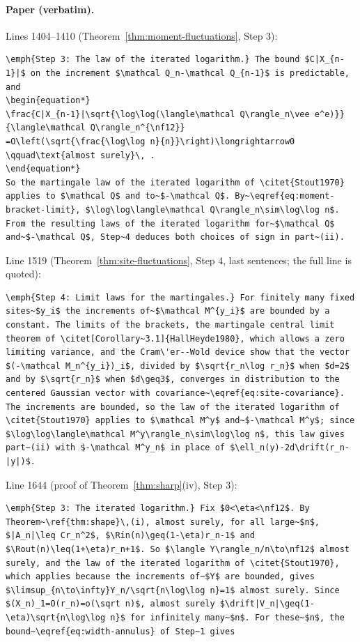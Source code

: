 \paragraph{Paper (verbatim).} Lines 1404--1410 (Theorem~\ref{thm:moment-fluctuations}, Step 3):
\begin{verbatim}
\emph{Step 3: The law of the iterated logarithm.} The bound $C|X_{n-1}|$ on the increment $\mathcal Q_n-\mathcal Q_{n-1}$ is predictable, and
\begin{equation*}
\frac{C|X_{n-1}|\sqrt{\log\log(\langle\mathcal Q\rangle_n\vee e^e)}}{\langle\mathcal Q\rangle_n^{\nf12}}
=O\left(\sqrt{\frac{\log\log n}{n}}\right)\longrightarrow0
\qquad\text{almost surely}\, .
\end{equation*}
So the martingale law of the iterated logarithm of \citet{Stout1970} applies to $\mathcal Q$ and to~$-\mathcal Q$. By~\eqref{eq:moment-bracket-limit}, $\log\log\langle\mathcal Q\rangle_n\sim\log\log n$. From the resulting laws of the iterated logarithm for~$\mathcal Q$ and~$-\mathcal Q$, Step~4 deduces both choices of sign in part~(ii).
\end{verbatim}
Line 1519 (Theorem~\ref{thm:site-fluctuations}, Step 4, last sentences; the full line is quoted):
\begin{verbatim}
\emph{Step 4: Limit laws for the martingales.} For finitely many fixed sites~$y_i$ the increments of~$\mathcal M^{y_i}$ are bounded by a constant. The limits of the brackets, the martingale central limit theorem of \citet[Corollary~3.1]{HallHeyde1980}, which allows a zero limiting variance, and the Cram\'er--Wold device show that the vector $(-\mathcal M_n^{y_i})_i$, divided by $\sqrt{r_n\log r_n}$ when $d=2$ and by $\sqrt{r_n}$ when $d\geq3$, converges in distribution to the centered Gaussian vector with covariance~\eqref{eq:site-covariance}. The increments are bounded, so the law of the iterated logarithm of \citet{Stout1970} applies to $\mathcal M^y$ and~$-\mathcal M^y$; since $\log\log\langle\mathcal M^y\rangle_n\sim\log\log n$, this law gives part~(ii) with $-\mathcal M^y_n$ in place of $\ell_n(y)-2d\drift(r_n-|y|)$.
\end{verbatim}
Line 1644 (proof of Theorem~\ref{thm:sharp}(iv), Step 3):
\begin{verbatim}
\emph{Step 3: The iterated logarithm.} Fix $0<\eta<\nf12$. By Theorem~\ref{thm:shape}\,(i), almost surely, for all large~$n$, $|A_n|\leq Cr_n^2$, $\Rin(n)\geq(1-\eta)r_n-1$ and $\Rout(n)\leq(1+\eta)r_n+1$. So $\langle Y\rangle_n/n\to\nf12$ almost surely, and the law of the iterated logarithm of \citet{Stout1970}, which applies because the increments of~$Y$ are bounded, gives $\limsup_{n\to\infty}Y_n/\sqrt{n\log\log n}=1$ almost surely. Since $(X_n)_1=O(r_n)=o(\sqrt n)$, almost surely $\drift|V_n|\geq(1-\eta)\sqrt{n\log\log n}$ for infinitely many~$n$. For these~$n$, the bound~\eqref{eq:width-annulus} of Step~1 gives
\end{verbatim}
